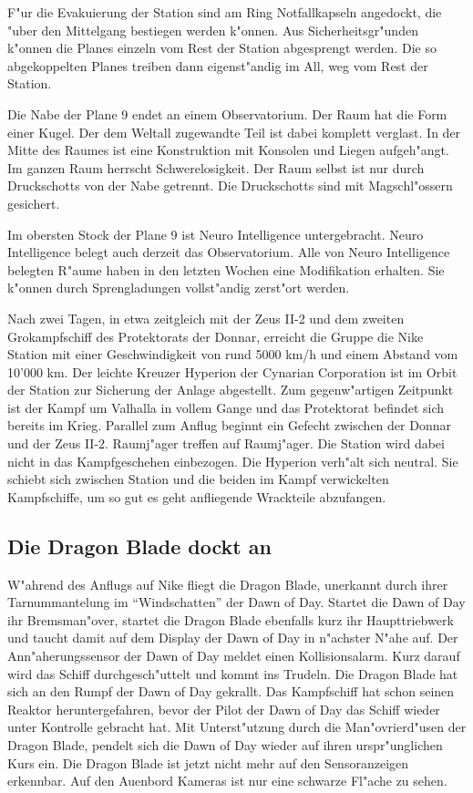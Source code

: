 F"ur die Evakuierung der Station sind am Ring Notfallkapseln angedockt, die "uber den Mittelgang bestiegen werden k"onnen. Aus Sicherheitsgr"unden k"onnen die Planes einzeln vom Rest der Station abgesprengt werden. Die so abgekoppelten Planes treiben dann eigenst"andig im All, weg vom Rest der Station. 

Die Nabe der Plane 9 endet an einem Observatorium. Der Raum hat die Form einer Kugel. Der dem Weltall zugewandte Teil ist dabei komplett verglast. In der Mitte des Raumes ist eine Konstruktion mit Konsolen und Liegen aufgeh"angt. Im ganzen Raum herrscht Schwerelosigkeit. Der Raum selbst ist nur durch Druckschotts von der Nabe getrennt. Die Druckschotts sind mit Magschl"ossern gesichert. 

Im obersten Stock der Plane 9 ist Neuro Intelligence untergebracht. Neuro Intelligence belegt auch derzeit das Observatorium. Alle von Neuro Intelligence belegten R"aume haben in den letzten Wochen eine Modifikation erhalten. Sie k"onnen durch Sprengladungen vollst"andig zerst"ort werden.



Nach zwei Tagen, in etwa zeitgleich mit der Zeus II-2 und dem zweiten Gro\3kampfschiff des Protektorats der Donnar, erreicht die Gruppe die Nike Station mit einer Geschwindigkeit von rund 5000 km/h und einem Abstand vom 10'000 km. Der leichte Kreuzer Hyperion der Cynarian Corporation ist im Orbit der Station zur Sicherung der Anlage abgestellt. Zum gegenw"artigen Zeitpunkt ist der Kampf um Valhalla in vollem Gange und das Protektorat befindet sich bereits im Krieg. Parallel zum Anflug beginnt ein Gefecht zwischen der Donnar und der Zeus II-2. Raumj"ager treffen auf Raumj"ager. Die Station wird dabei nicht in das Kampfgeschehen einbezogen. Die Hyperion verh"alt sich neutral. Sie schiebt sich zwischen Station und die beiden im Kampf verwickelten Kampfschiffe, um so gut es geht anfliegende Wrackteile abzufangen.

\subsection{Die Dragon Blade dockt an}
W"ahrend des Anflugs auf Nike fliegt die Dragon Blade, unerkannt durch ihrer Tarnummantelung im "`Windschatten"' der Dawn of Day. Startet die Dawn of Day ihr Bremsman"over, startet die Dragon Blade ebenfalls kurz ihr Haupttriebwerk und taucht damit auf dem Display der Dawn of Day in n"achster N"ahe auf. Der Ann"aherungssensor der Dawn of Day meldet einen Kollisionsalarm. Kurz darauf wird das Schiff durchgesch"uttelt und kommt ins Trudeln. Die Dragon Blade hat sich an den Rumpf der Dawn of Day gekrallt. Das Kampfschiff hat schon seinen Reaktor heruntergefahren, bevor der Pilot der Dawn of Day das Schiff wieder unter Kontrolle gebracht hat. Mit Unterst"utzung durch die Man"ovrierd"usen der Dragon Blade, pendelt sich die Dawn of Day wieder auf ihren urspr"unglichen Kurs ein. Die Dragon Blade ist jetzt nicht mehr auf den Sensoranzeigen erkennbar. Auf den Au\3enbord Kameras ist nur eine schwarze Fl"ache zu sehen.

